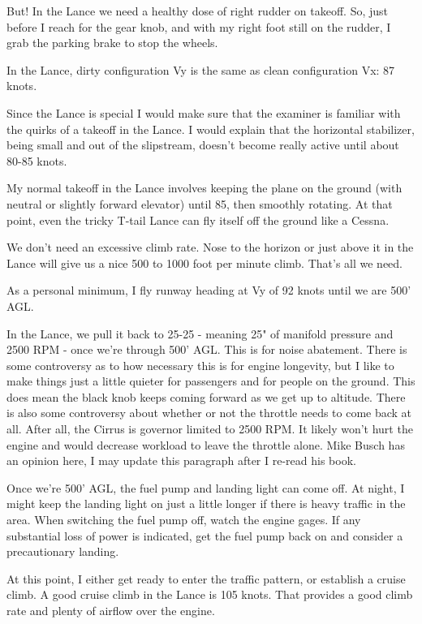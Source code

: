 But! In the Lance we need a healthy dose of right rudder on takeoff. So, just before I reach for the gear knob, and with my right foot still on the rudder, I grab the parking brake to stop the wheels.

In the Lance, dirty configuration Vy is the same as clean configuration Vx: 87 knots.

Since the Lance is special I would make sure that the examiner is familiar with the quirks of a takeoff in the Lance. I would explain that the horizontal stabilizer, being small and out of the slipstream, doesn't become really active until about 80-85 knots.

My normal takeoff in the Lance involves keeping the plane on the ground (with neutral or slightly forward elevator) until 85, then smoothly rotating. At that point, even the tricky T-tail Lance can fly itself off the ground like a Cessna.

We don't need an excessive climb rate. Nose to the horizon or just above it in the Lance will give us a nice 500 to 1000 foot per minute climb. That's all we need.

As a personal minimum, I fly runway heading at Vy of 92 knots until we are 500' AGL.

In the Lance, we pull it back to 25-25 - meaning 25" of manifold pressure and 2500 RPM - once we're through 500' AGL. This is for noise abatement. There is some controversy as to how necessary this is for engine longevity, but I like to make things just a little quieter for passengers and for people on the ground. This does mean the black knob keeps coming forward as we get up to altitude. There is also some controversy about whether or not the throttle needs to come back at all. After all, the Cirrus is governor limited to 2500 RPM. It likely won't hurt the engine and would decrease workload to leave the throttle alone. Mike Busch has an opinion here, I may update this paragraph after I re-read his book.

Once we're 500' AGL, the fuel pump and landing light can come off. At night, I might keep the landing light on just a little longer if there is heavy traffic in the area. When switching the fuel pump off, watch the engine gages. If any substantial loss of power is indicated, get the fuel pump back on and consider a precautionary landing.

At this point, I either get ready to enter the traffic pattern, or establish a cruise climb. A good cruise climb in the Lance is 105 knots. That provides a good climb rate and plenty of airflow over the engine.

